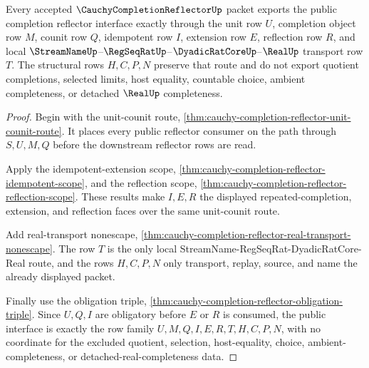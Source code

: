 \begin{theorem}
\label{thm:cauchy-completion-reflector-public-reflector-export}
Every accepted $\CauchyCompletionReflectorUp$ packet exports the public completion reflector interface exactly through the unit row $U$, completion object row $M$, counit row $Q$, idempotent row $I$, extension row $E$, reflection row $R$, and local $\StreamNameUp$--$\RegSeqRatUp$--$\DyadicRatCoreUp$--$\RealUp$ transport row $T$. The structural rows $H,C,P,N$ preserve that route and do not export quotient completions, selected limits, host equality, countable choice, ambient completeness, or detached $\RealUp$ completeness.
\end{theorem}
\begin{proof}
Begin with the unit-counit route, \autoref{thm:cauchy-completion-reflector-unit-counit-route}. It places every public reflector consumer on the path through $S,U,M,Q$ before the downstream reflector rows are read.

Apply the idempotent-extension scope, \autoref{thm:cauchy-completion-reflector-idempotent-scope}, and the reflection scope, \autoref{thm:cauchy-completion-reflector-reflection-scope}. These results make $I,E,R$ the displayed repeated-completion, extension, and reflection faces over the same unit-counit route.

Add real-transport nonescape, \autoref{thm:cauchy-completion-reflector-real-transport-nonescape}. The row $T$ is the only local StreamName-RegSeqRat-DyadicRatCore-Real route, and the rows $H,C,P,N$ only transport, replay, source, and name the already displayed packet.

Finally use the obligation triple, \autoref{thm:cauchy-completion-reflector-obligation-triple}. Since $U,Q,I$ are obligatory before $E$ or $R$ is consumed, the public interface is exactly the row family $U,M,Q,I,E,R,T,H,C,P,N$, with no coordinate for the excluded quotient, selection, host-equality, choice, ambient-completeness, or detached-real-completeness data.
\end{proof}

